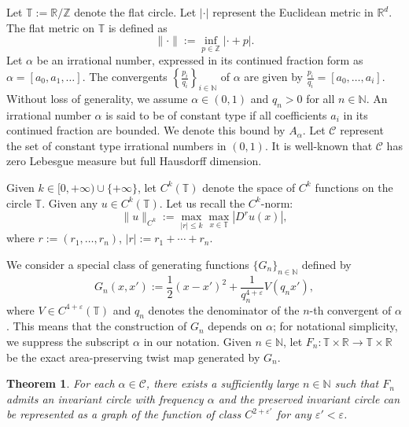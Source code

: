 \documentclass{amsart}
\newtheorem{Theorem}{Theorem}
\theoremstyle{definition}
\begin{document}
Let \( \mathbb{T} := \mathbb{R}/\mathbb{Z} \) denote the flat circle. Let \( |\cdot| \) represent the Euclidean metric in \( \mathbb{R}^d \). The flat metric on \( \mathbb{T} \) is defined as
\begin{equation}\label{flamet}
\|\cdot\| := \inf_{p \in \mathbb{Z}} |\cdot + p|.
\end{equation}
Let \( \alpha \) be an irrational number, expressed in its continued fraction form as \( \alpha = [a_0, a_1, \ldots] \). The convergents \( \left\{ \frac{p_i}{q_i} \right\}_{i \in \mathbb{N}} \) of \( \alpha \) are given by \( \frac{p_i}{q_i} = [a_0, \ldots, a_i] \). Without loss of generality, we assume \( \alpha \in (0, 1) \) and \( q_n > 0 \) for all \( n \in \mathbb{N} \). An irrational number \( \alpha \) is said to be of constant type if all coefficients \( a_i \) in its continued fraction are bounded. We denote this bound by \( A_\alpha \). Let \( \mathcal{C} \) represent the set of constant type irrational numbers in \( (0, 1) \). It is well-known that \( \mathcal{C} \) has zero Lebesgue measure but full Hausdorff dimension.

Given $k \in [0, +\infty) \cup \{+\infty\}$, let $C^k(\mathbb{T})$ denote the space of $C^k$ functions on the circle $\mathbb{T}$. Given any $u\in C^k(\mathbb{T})$. Let us recall the $C^k$-norm:
\[\|u\|_{C^k}:=\max_{|r|\leq k}\max_{x\in \mathbb{T}}|D^{r}u(x)|,\]
where $r:=(r_1,\ldots,r_n)$, $|r|:=r_1+\cdots+r_n$.

We consider a special class of generating functions \( \{G_n\}_{n \in \mathbb{N}} \) defined by
\begin{equation}\label{epss}
G_n(x, x') := \frac{1}{2}(x - x')^2 + \frac{1}{q_n^{4+\varepsilon}} V(q_n x'),
\end{equation}
where  \( V \in C^{4+\varepsilon}(\mathbb{T}) \) and \( q_n \) denotes the denominator of the \(n\)-th convergent of \( \alpha \). This means that the construction of \( G_n \) depends on \( \alpha \); for notational simplicity, we suppress the subscript \( \alpha \) in our notation. Given $n\in \mathbb{N}$, let \( F_n: \mathbb{T} \times \mathbb{R} \to \mathbb{T} \times \mathbb{R} \) be the exact area-preserving twist map generated by \( G_n \).

\begin{Theorem}\label{mathe}
For each \( \alpha \in \mathcal{C} \), there exists a sufficiently large \( n \in \mathbb{N} \) such that \( F_n \) admits an invariant circle with frequency \( \alpha \) and the preserved invariant circle can be represented as a graph of the function of class \( C^{2+\varepsilon'} \) for any \( \varepsilon' < \varepsilon \).
\end{Theorem}
\end{document}
